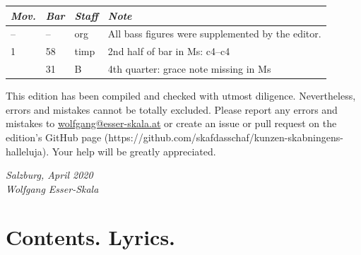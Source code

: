 \documentclass[parskip=full]{scrreprt}
\begin{document}
\bigskip


\begin{longtable}{lll L{10cm}}
	\toprule
	\itshape Mov. & \itshape Bar & \itshape Staff & \itshape Note \\
	\midrule \endhead
	–  & –   & org   & All bass figures were supplemented by the editor. \\
	1  & 58  & timp  & 2nd half of bar in Ms: c4–c4 \\
	   & 31  & B     & 4th quarter: grace note missing in Ms \\
	\bottomrule
\end{longtable}


This edition has been compiled and checked with utmost diligence. Nevertheless, errors and mistakes cannot be totally excluded. Please report any errors and mistakes to \url{wolfgang@esser-skala.at} or create an issue or pull request on the edition’s GitHub page (https://github.com/skafdasschaf/kunzen-skabningens-halleluja). Your help will be greatly appreciated.

\bigskip
\textit{Salzburg, April 2020\\
Wolfgang Esser-Skala}




\chapter*{Contents. Lyrics.}
\end{document}
